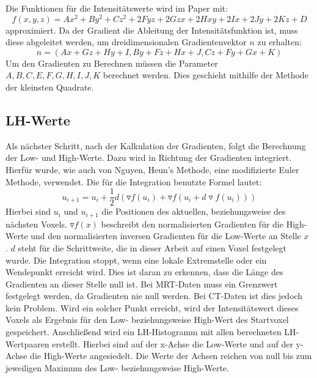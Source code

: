 Die Funktionen für die Intensitätswerte wird im Paper mit:
\begin{equation}
	f(x,y,z) = Ax^{2}+By^{2}+Cz^{2}+2Fyz+2Gzx+2Hxy+2Ix+2Jy+2Kz+D
\end{equation}
approximiert. Da der Gradient die Ableitung der Intensitätsfunktion ist, muss diese abgeleitet werden, um dreidimensionalen Gradientenvektor $n$ zu erhalten:
\begin{equation}
	n = (Ax+Gz+Hy+I, By+Fz+Hx+J, Cz + Fy + Gx + K)
\end{equation}
Um den Gradienten zu Berechnen müssen die Parameter $A,B,C,E,F,G,H,I,J,K$  berechnet werden. Dies geschieht mithilfe der Methode der kleinsten Quadrate.

\subsection{LH-Werte}

Als nächster Schritt, nach der Kalkulation der Gradienten, folgt die Berechnung der Low- und High-Werte. Dazu wird in Richtung der Gradienten integriert. Hierfür wurde, wie auch von Nguyen, Heun's Methode, eine modifizierte Euler Methode, verwendet. Die für die Integration benutzte Formel lautet:
\begin{equation}
	u_{i+1} = u_{i} + \frac{1}{2}d(\triangledown f (u_{i}) + \triangledown f(u_{i}+d \triangledown f(u_{i}))) 
\end{equation}
Hierbei sind $u_{i}$ und $u_{i+1}$ die Positionen des aktuellen, beziehungsweise des nächsten Voxels. $\triangledown f(x)$ beschreibt den normalisierten Gradienten für die High-Werte und den normalisierten inversen Gradienten für die Low-Werte an Stelle $x$ . $d$ steht für die Schrittweite, die in dieser Arbeit auf einen Voxel festgelegt wurde.
Die Integration stoppt, wenn eine lokale Extremstelle oder ein Wendepunkt erreicht wird. Dies ist daran zu erkennen, dass die Länge des Gradienten an dieser Stelle null ist. Bei MRT-Daten muss ein Grenzwert festgelegt werden, da Gradienten nie null werden. Bei CT-Daten ist dies jedoch kein Problem. Wird ein solcher Punkt erreicht, wird der Intensitätswert dieses Voxels als Ergebnis für den Low- beziehungsweise High-Wert des Startvoxel gespeichert.
\newline
Anschließend wird ein LH-Histogramm mit allen berechneten LH-Wertpaaren erstellt. Hierbei sind auf der x-Achse die Low-Werte und auf der y-Achse die High-Werte angesiedelt. Die Werte der Achsen reichen von null bis zum jeweiligen Maximum des Low- beziehungsweise High-Werte.

